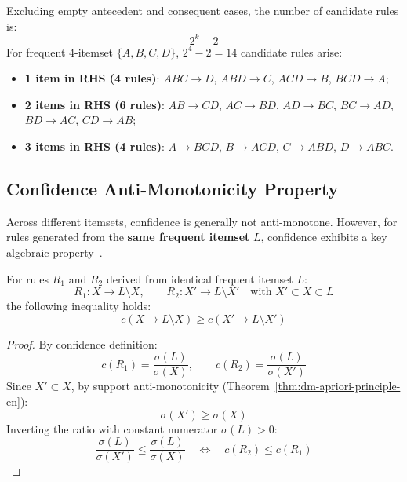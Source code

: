 Excluding empty antecedent and consequent cases, the number of candidate rules is:
\begin{equation}
2^k - 2
\end{equation}
For frequent 4-itemset $\{A, B, C, D\}$, $2^4 - 2 = 14$ candidate rules arise:
\begin{itemize}[noitemsep]
    \item \textbf{1 item in RHS (4 rules)}: $ABC \rightarrow D$, $ABD \rightarrow C$, $ACD \rightarrow B$, $BCD \rightarrow A$;
    \item \textbf{2 items in RHS (6 rules)}: $AB \rightarrow CD$, $AC \rightarrow BD$, $AD \rightarrow BC$, $BC \rightarrow AD$, $BD \rightarrow AC$, $CD \rightarrow AB$;
    \item \textbf{3 items in RHS (4 rules)}: $A \rightarrow BCD$, $B \rightarrow ACD$, $C \rightarrow ABD$, $D \rightarrow ABC$.
\end{itemize}

\subsection{Confidence Anti-Monotonicity Property}
Across different itemsets, confidence is generally not anti-monotone. However, for rules generated from the \textbf{same frequent itemset} $L$, confidence exhibits a key algebraic property~\cite{tan2018}.

\begin{theorem}
\label{thm:dm-rule-confidence-pruning-en}
For rules $R_1$ and $R_2$ derived from identical frequent itemset $L$:
\begin{equation}
R_1: X \longrightarrow L \setminus X, \qquad R_2: X' \longrightarrow L \setminus X' \quad \text{with } X' \subset X \subset L
\end{equation}
the following inequality holds:
\begin{equation}
c(X \longrightarrow L \setminus X) \ge c(X' \longrightarrow L \setminus X')
\end{equation}
\end{theorem}

\begin{proof}
By confidence definition:
\begin{equation}
c(R_1) = \frac{\sigma(L)}{\sigma(X)}, \qquad c(R_2) = \frac{\sigma(L)}{\sigma(X')}
\end{equation}
Since $X' \subset X$, by support anti-monotonicity (Theorem~\ref{thm:dm-apriori-principle-en}):
\begin{equation}
\sigma(X') \ge \sigma(X)
\end{equation}
Inverting the ratio with constant numerator $\sigma(L) > 0$:
\begin{equation}
\frac{\sigma(L)}{\sigma(X')} \le \frac{\sigma(L)}{\sigma(X)} \quad \Longleftrightarrow \quad c(R_2) \le c(R_1)
\end{equation}
\end{proof}

